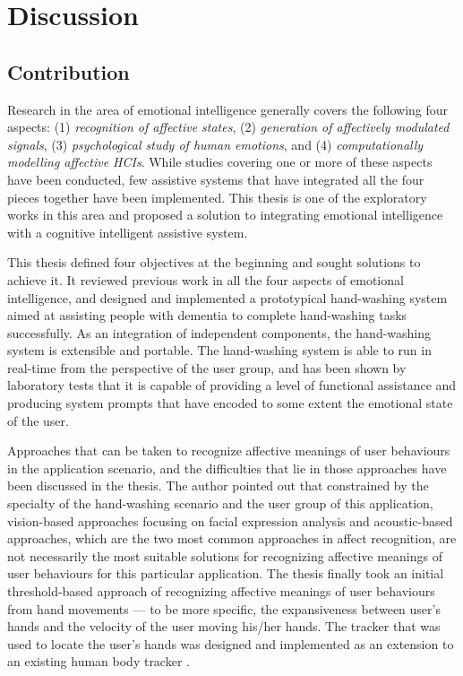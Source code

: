 \chapter{Discussion}
\label{chap:discuss}

\section{Contribution}

Research in the area of emotional intelligence generally covers the following four aspects: (1) \textit{recognition of affective states}, (2) \textit{generation of affectively modulated signals}, (3) \textit{psychological study of human emotions}, and (4) \textit{computationally modelling affective HCIs}. While studies covering one or more of these aspects have been conducted, few assistive systems that have integrated all the four pieces together have been implemented. This thesis is one of the exploratory works in this area and proposed a solution to integrating emotional intelligence with a cognitive intelligent assistive system. 

This thesis defined four objectives at the beginning and sought solutions to achieve it. It reviewed previous work in all the four aspects of emotional intelligence, and designed and implemented a prototypical hand-washing system aimed at assisting people with dementia to complete hand-washing tasks successfully. As an integration of independent components, the hand-washing system is extensible and portable. The hand-washing system is able to run in real-time from the perspective of the user group, and has been shown by laboratory tests that it is capable of providing a level of functional assistance and producing system prompts that have encoded to some extent the emotional state of the user.

Approaches that can be taken to recognize affective meanings of user behaviours in the application scenario, and the difficulties that lie in those approaches have been discussed in the thesis. The author pointed out that constrained by the specialty of the hand-washing scenario and the user group of this application, vision-based approaches focusing on facial expression analysis and acoustic-based approaches, which are the two most common approaches in affect recognition, are not necessarily the most suitable solutions for recognizing affective meanings of user behaviours for this particular application. The thesis finally took an initial threshold-based approach of recognizing affective meanings of user behaviours from hand movements --- to be more specific, the expansiveness between user's hands and the velocity of the user moving his/her hands. The tracker that was used to locate the user's hands was designed and implemented as an extension to an existing human body tracker \cite{czarnuch2014}.

